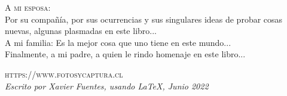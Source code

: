 \noindent \textsc{A mi esposa:}\\

\noindent Por su compañía, por sus ocurrencias y sus singulares ideas de probar cosas nuevas, algunas plasmadas en este libro...\\

\noindent A mi familia: Es la mejor cosa que uno tiene en este mundo...\\ 

\noindent Finalmente, a mi padre, a quien le rindo homenaje en este libro...

\noindent \textsc{https://www.fotosycaptura.cl}\\ %

\noindent \textit{Escrito por Xavier Fuentes, usando \LaTeX, Junio 2022}
